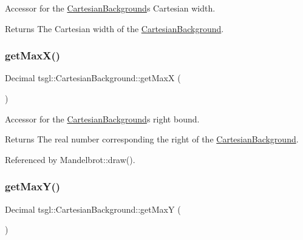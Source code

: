 Accessor for the \hyperlink{classtsgl_1_1_cartesian_background}{Cartesian\+Background}\textquotesingle{}s Cartesian width. 

\begin{DoxyReturn}{Returns}
The Cartesian width of the \hyperlink{classtsgl_1_1_cartesian_background}{Cartesian\+Background}. 
\end{DoxyReturn}
\mbox{\label{classtsgl_1_1_cartesian_background_af8131853b72c0ff370b1b558bf2c8073}} 
\subsubsection{\texorpdfstring{get\+Max\+X()}{getMaxX()}}
{\footnotesize\ttfamily Decimal tsgl\+::\+Cartesian\+Background\+::get\+MaxX (\begin{DoxyParamCaption}{ }\end{DoxyParamCaption})\hspace{0.3cm}{\ttfamily [inline]}}



Accessor for the \hyperlink{classtsgl_1_1_cartesian_background}{Cartesian\+Background}\textquotesingle{}s right bound. 

\begin{DoxyReturn}{Returns}
The real number corresponding the right of the \hyperlink{classtsgl_1_1_cartesian_background}{Cartesian\+Background}. 
\end{DoxyReturn}


Referenced by Mandelbrot\+::draw().

\mbox{\label{classtsgl_1_1_cartesian_background_a6f0d1852411eae2fe0a2822a6da29d7d}} 
\subsubsection{\texorpdfstring{get\+Max\+Y()}{getMaxY()}}
{\footnotesize\ttfamily Decimal tsgl\+::\+Cartesian\+Background\+::get\+MaxY (\begin{DoxyParamCaption}{ }\end{DoxyParamCaption})\hspace{0.3cm}{\ttfamily [inline]}}



